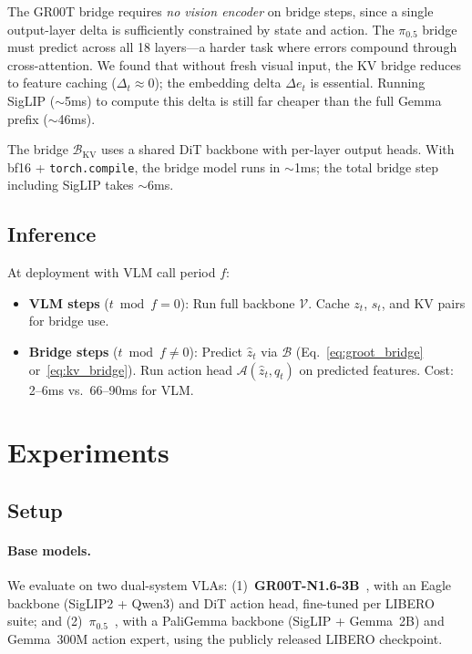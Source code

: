 \documentclass{article}
\begin{document}
The GR00T bridge requires \emph{no vision encoder} on bridge steps, since a single output-layer delta is sufficiently constrained by state and action.
The $\pi_{0.5}$ bridge must predict across all 18 layers---a harder task where errors compound through cross-attention.
We found that without fresh visual input, the KV bridge reduces to feature caching ($\Delta_t \approx 0$); the embedding delta $\Delta e_t$ is essential.
Running SigLIP ($\sim$5ms) to compute this delta is still far cheaper than the full Gemma prefix ($\sim$46ms).

The bridge $\mathcal{B}_\text{KV}$ uses a shared DiT backbone with per-layer output heads.
With bf16 + \texttt{torch.compile}, the bridge model runs in $\sim$1ms; the total bridge step including SigLIP takes $\sim$6ms.

\subsection{Inference}

At deployment with VLM call period $f$:
\begin{itemize}
    \item \textbf{VLM steps} ($t \bmod f = 0$): Run full backbone $\mathcal{V}$. Cache $z_t$, $s_t$, and KV pairs for bridge use.
    \item \textbf{Bridge steps} ($t \bmod f \neq 0$): Predict $\hat{z}_t$ via $\mathcal{B}$ (Eq.~\ref{eq:groot_bridge} or~\ref{eq:kv_bridge}). Run action head $\mathcal{A}(\hat{z}_t, q_t)$ on predicted features. Cost: 2--6ms vs.\ 66--90ms for VLM.
\end{itemize}

\section{Experiments}

\subsection{Setup}

\paragraph{Base models.}
We evaluate on two dual-system VLAs:
(1)~\textbf{GR00T-N1.6-3B}~\cite{bjorck2025groot}, with an Eagle backbone (SigLIP2 + Qwen3) and DiT action head, fine-tuned per LIBERO suite; and
(2)~\textbf{$\pi_{0.5}$}~\cite{black2024pi0}, with a PaliGemma backbone (SigLIP + Gemma~2B) and Gemma~300M action expert, using the publicly released LIBERO checkpoint.
\end{document}

